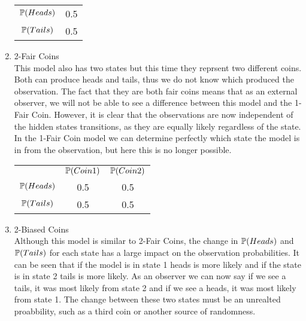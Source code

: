 \begin{example}
\begin{enumerate}
\begin{center}
			\begin{tabular}{c c}
		 		$\mathbb{P} (Heads)$  & 0.5 \\
		 		$\mathbb{P} (Tails)$  & 0.5  \\  
			\end{tabular}
		\end{center}
		\item 2-Fair Coins \\ This model also has two states but this time they reprsent two different coins. Both can produce heads and tails, thus we do not know which produced the observation. The fact that they are both fair coins means that as an external observer, we will not be able to see a difference between this model and the 1-Fair Coin. However, it is clear that the observations are now independent of the hidden states transitions, as they are equally likely regardless of the state. In the 1-Fair Coin model we can determine perfectly which state the model is in from the observation, but here this is no longer possible.
		\begin{center}
	
			\begin{tabular}{c c c}
				& $\mathbb{P} (Coin 1)$ & $\mathbb{P} (Coin 2)$ \\
		 		$\mathbb{P} (Heads)$  & 0.5   & 0.5 \\
		 		$\mathbb{P} (Tails)$  & 0.5   & 0.5 \\
			\end{tabular}
		\end{center}
		\item  2-Biased Coins \\ Although this model is similar to 2-Fair Coins, the change in $\mathbb{P} (Heads)$ and $\mathbb{P} (Tails)$ for each state has a large impact on the observation probabilities. It can be seen that if the model is in state 1 heads is more likely and if the state is in state 2 tails is more likely. As an observer we can now say if we see a tails, it was most likely from state 2 and if we see a heads, it was most likely from state 1. The change between these two states must be an unrealted proabbility, such as a third coin or another source of randomness.
		\begin{center}
\end{center}
\end{enumerate}
\end{example}
